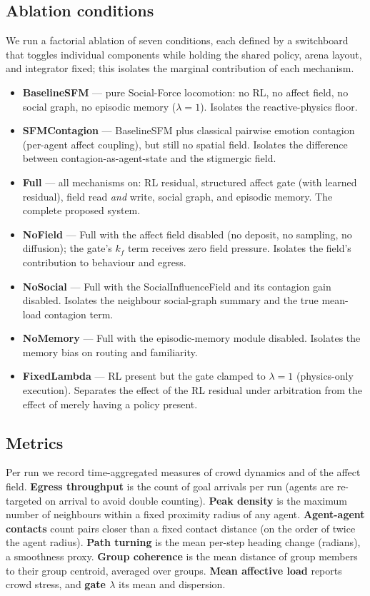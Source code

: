 \documentclass[sigconf,nonacm]{acmart}
\begin{document}
\subsection{Ablation conditions}
We run a factorial ablation of seven conditions, each defined by a switchboard
that toggles individual components while holding the shared policy, arena
layout, and integrator fixed; this isolates the marginal contribution of each
mechanism.
\begin{itemize}
  \item \textbf{BaselineSFM} --- pure Social-Force locomotion: no RL, no affect
  field, no social graph, no episodic memory ($\lambda=1$). Isolates the
  reactive-physics floor.
  \item \textbf{SFMContagion} --- BaselineSFM plus classical pairwise emotion
  contagion (per-agent affect coupling), but still no spatial field. Isolates
  the difference between contagion-as-agent-state and the stigmergic field.
  \item \textbf{Full} --- all mechanisms on: RL residual, structured affect
  gate (with learned residual), field read \emph{and} write, social graph, and
  episodic memory. The complete proposed system.
  \item \textbf{NoField} --- Full with the affect field disabled (no deposit,
  no sampling, no diffusion); the gate's $k_f$ term receives zero field
  pressure. Isolates the field's contribution to behaviour and egress.
  \item \textbf{NoSocial} --- Full with the SocialInfluenceField and its
  contagion gain disabled. Isolates the neighbour social-graph summary and the
  true mean-load contagion term.
  \item \textbf{NoMemory} --- Full with the episodic-memory module disabled.
  Isolates the memory bias on routing and familiarity.
  \item \textbf{FixedLambda} --- RL present but the gate clamped to
  $\lambda=1$ (physics-only execution). Separates the effect of the RL
  residual under arbitration from the effect of merely having a policy present.
\end{itemize}

\subsection{Metrics}
Per run we record time-aggregated measures of crowd dynamics and of the affect
field. \textbf{Egress throughput} is the count of goal arrivals per run (agents
are re-targeted on arrival to avoid double counting). \textbf{Peak density} is
the maximum number of neighbours within a fixed proximity radius of any agent.
\textbf{Agent-agent contacts} count pairs closer than a fixed contact distance
(on the order of twice the agent radius). \textbf{Path turning} is the mean
per-step heading change (radians), a smoothness proxy. \textbf{Group coherence}
is the mean distance of group members to their group centroid, averaged over
groups. \textbf{Mean affective load} reports crowd stress, and \textbf{gate
$\lambda$} its mean and dispersion.
\end{document}
